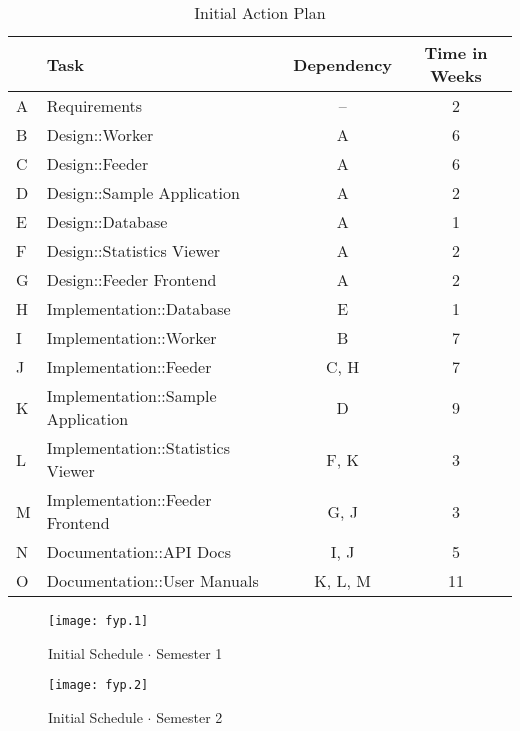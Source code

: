 \begin{table}[H]
\begin{tabularx}{\linewidth}{llcc}
\toprule
\textbf{} & \textbf{Task} & \textbf{Dependency} & \textbf{Time in Weeks} \\
\midrule
\endhead
A & Requirements                       & --      & 2  \\
B & Design::Worker                     & A       & 6  \\
C & Design::Feeder                     & A       & 6  \\
D & Design::Sample Application         & A       & 2  \\
E & Design::Database                   & A       & 1  \\
F & Design::Statistics Viewer          & A       & 2  \\
G & Design::Feeder Frontend            & A       & 2  \\
H & Implementation::Database           & E       & 1  \\
I & Implementation::Worker             & B       & 7  \\
J & Implementation::Feeder             & C, H    & 7  \\
K & Implementation::Sample Application & D       & 9  \\
L & Implementation::Statistics Viewer  & F, K    & 3  \\
M & Implementation::Feeder Frontend    & G, J    & 3  \\
N & Documentation::API Docs            & I, J    & 5  \\
O & Documentation::User Manuals        & K, L, M & 11 \\
\bottomrule
\end{tabularx}
\caption{Initial Action Plan}
\label{tab:actionplan}
\end{table}

\begin{figure}[H]
\begin{flushleft}
\texttt{[image: fyp.1]}
\end{flushleft}
\caption{Initial Schedule $\cdot$ Semester 1}
\label{fig:gantt1}
\end{figure}

\begin{figure}[H]
\begin{flushleft}
\texttt{[image: fyp.2]}
\end{flushleft}
\caption{Initial Schedule $\cdot$ Semester 2}
\label{fig:gantt2}
\end{figure}

